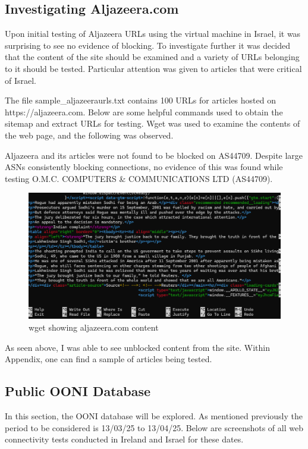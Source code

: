 \subsection{Investigating Aljazeera.com}
Upon initial testing of Aljazeera URLs using the virtual machine in Israel, it was surprising to see no evidence of blocking. To investigate further it was decided that the content of the site should be examined and a variety of URLs belonging to it should be tested. Particular attention was given to articles that were critical of Israel. 

The file sample\_aljazeeraurls.txt contains 100 URLs for articles hosted on https://aljazeera.com. Below are some helpful commands used to obtain the sitemap and extract URLs for testing. Wget was used to examine the contents of the web page, and the following was observed.

Aljazeera and its articles were not found to be blocked on AS44709. Despite large ASNs consistently blocking connections, no evidence of this was found while testing O.M.C. COMPUTERS \& COMMUNICATIONS LTD (AS44709).

\begin{figure} [H]
    \centering
    \includegraphics[width=1\linewidth]{wgetAljazeera.png}
    \caption{wget showing aljazeera.com content}
    \label{fig:enter-label}
\end{figure}


As seen above, I was able to see unblocked content from the site. Within Appendix, one can find a sample of articles being tested. 

\subsection{Public OONI Database}
In this section, the OONI database will be explored. As mentioned previously the period to be considered is 13/03/25 to 13/04/25. Below are screenshots of all web connectivity tests conducted in Ireland and Israel for these dates. 

